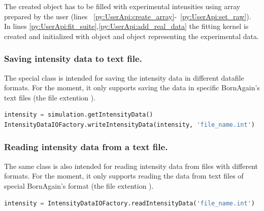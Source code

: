 The created  object has to be filled with experimental intensities
using  array prepared by the user (lines ~\ref{py:UserApi:create_array}-~\ref{py:UserApi:set_raw}). In lines \ref{py:UserApi:fit_suite},\ref{py:UserApi:add_real_data} the fitting kernel is created and initialized with  object and
 object representing the experimental data.


\subsubsection{Saving intensity data to text file.}

The special class  is intended for saving the intensity data
in different datafile formats. For the moment, it only supports saving the data in specific BornAgain's text files (the file extention ).

\begin{lstlisting}[language=python, style=eclipseboxed]
intensity = simulation.getIntensityData()
IntensityDataIOFactory.writeIntensityData(intensity, 'file_name.int')
\end{lstlisting}

\subsubsection{Reading intensity data from a text file.}
The same class is also intended for reading intensity data
from files with different formats. For the moment, it only supports reading the data from text files of special BornAgain's format (the file extention ).

\begin{lstlisting}[language=python, style=eclipseboxed]
intensity = IntensityDataIOFactory.readIntensityData('file_name.int')
\end{lstlisting}
